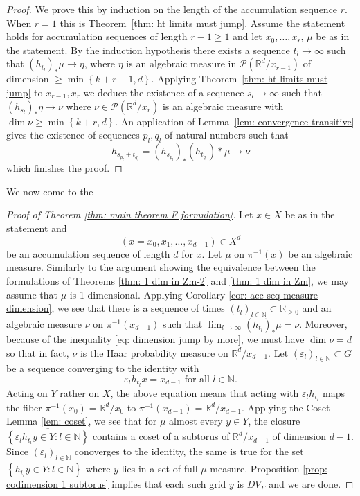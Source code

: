 \documentclass[reqno,11pt, twoside]{amsart}
\theoremstyle{plain}
\theoremstyle{definition}
\theoremstyle{definition}
\theoremstyle{remark}
\numberwithin{equation}{section}
\newcommand{\R}{{\mathbb{R}}}
\newcommand{\N}{{\mathbb{N}}}
\newcommand{\cP}{\mathcal{P}}
\newcommand{\bR}{\mathbb{R}}
\newcommand\seta[1]{\left\{#1\right\}}
\begin{document}
\begin{proof}
    We prove this by induction on the length of the accumulation sequence $r$. When $r=1$ this is Theorem~\ref{thm: ht limits must jump}. Assume the statement holds for accumulation sequences of length $r-1\ge1$ and let $x_0,\dots, x_r$, $\mu$ be as in the statement. By the induction 
    hypothesis there exists a sequence $t_l\to\infty$ such that $(h_{t_l})_*\mu\to \eta$, where $\eta$ is an algebraic measure in $\cP(\bR^d/x_{r-1})$ of dimension $\ge \min\seta{k+r-1,d}$. Applying 
    Theorem~\ref{thm: ht limits must jump} to $x_{r-1},x_r$ we deduce the existence of a sequence $s_l\to \infty$ such that $(h_{s_l})_*\eta\to \nu$ where $\nu\in\cP(\bR^d/x_r)$ is an algebraic measure with $\dim \nu\ge \min\seta{k+r,d}$. An application of 
    Lemma~\ref{lem: convergence transitive} gives the existence of sequences $p_l,q_l$ of natural numbers such that
    $$h_{s_{p_l}+t_{q_l}}=(h_{s_{p_l}})_*(h_{t_{q_l}})*\mu\to \nu$$
    which finishes the proof.

\end{proof}

We now come to the
\begin{proof}[Proof of Theorem \ref{thm: main theorem F formulation}]
    Let $x \in X$ be as in the statement and
    \begin{equation*}
        (x = x_0, x_1, \dots, x_{d-1}) \in X^d
    \end{equation*}
    be an accumulation sequence of length $d$ for $x$. 
    Let $\mu$ on $\pi^{-1}(x)$ be an algebraic measure. Similarly to the argument showing the equivalence between the formulations of Theorems \ref{thm: 1 dim in Zm-2} and \ref{thm: 1 dim in Zm}, we may assume that $\mu$ is 1-dimensional.
    Applying Corollary \ref{cor: acc seq measure dimension}, we see that there is a sequence of times $(t_l)_{l \in \N} \subset \R_{\geq 0}$ and an algebraic measure $\nu$  on $\pi^{-1}(x_{d-1})$ such that 
    $\lim_{l \to \infty} (h_{t_l})_* \mu = \nu.$
    Moreover, because of the inequality \eqref{eq: dimension jump by more}, we must have $     \dim \nu= d$
    so that in fact, $\nu$ is the Haar probability measure on $\R^d/x_{d-1}$. Let $(\varepsilon_l)_{l \in\N} \subset G$ be a sequence converging to the identity with 
    \begin{equation*}
        \varepsilon_l h_{t_l} x = x_{d-1} \text{ for all } l \in \N.
    \end{equation*}
    Acting on $Y$ rather on $X$, the above equation means that acting with
    $\varepsilon_l h_{t_l}$ maps the fiber $\pi^{-1}(x_0)=\bR^d/x_0$ to 
    $\pi^{-1}(x_{d-1})=\bR^d/x_{d-1}$. 
Applying the Coset Lemma \ref{lem: coset}, we see that for $\mu$ almost every $y \in Y$, the closure
$\overline{\left\lbrace \varepsilon_l h_{t_l}y \in Y: l \in \N \right\rbrace}$
contains a coset of a subtorus of $\bR^d/x_{d-1}$ of dimension $d-1$. 
Since $(\varepsilon_l)_{l \in \N}$ conoverges to the identity, the same is true for the set
$   \overline{\left\lbrace h_{t_l}y \in Y: l \in \N \right\rbrace}$
where $y$ lies in a set of full $\mu$ measure.
Proposition \ref{prop: codimension 1 subtorus} implies that each such grid $y$
is $DV_F$
and we are done.
\end{proof}
\end{document}
